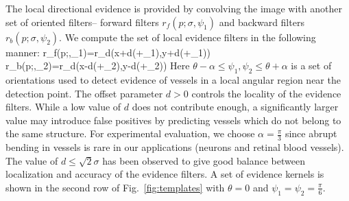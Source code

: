 The local directional evidence is provided by convolving the image with another set of oriented filters-- forward filters $r_f(p;\sigma,\psi_1)$ and backward filters $r_b(p;\sigma,\psi_2)$. We compute the set of local evidence filters in the following manner:
\bea
r_f(p;\sigma,\psi_1)=r_d(x+d\cos(\theta+\psi_1),y+d\sin(\theta+\psi_1)) \\
\label{eq:r_f}
r_b(p;\sigma,\psi_2)=r_d(x-d\cos(\theta+\psi_2),y-d\sin(\theta+\psi_2))
\label{eq:r_d}
\eea
Here $\theta-\alpha\le \psi_1,\psi_2 \le \theta+\alpha$ is a set of orientations used to detect evidence of vessels in a local angular region near the detection point. The offset parameter $d>0$ controls the locality of the evidence filters. While a low value of $d$ does not contribute enough, a significantly larger value may introduce false positives by predicting vessels which do not belong to the same structure. For experimental evaluation, we choose $\alpha=\frac{\pi}{3}$ since abrupt bending in vessels is rare in our applications (neurons and retinal blood vessels). The value of $d\leq\sqrt{2}\sigma$ has been observed to give good balance between localization and accuracy of the evidence filters. A set of evidence kernels is shown in the second row of Fig.~\ref{fig:templates} with $\theta=0$ and $\psi_1=\psi_2=\frac{\pi}{6}$.

